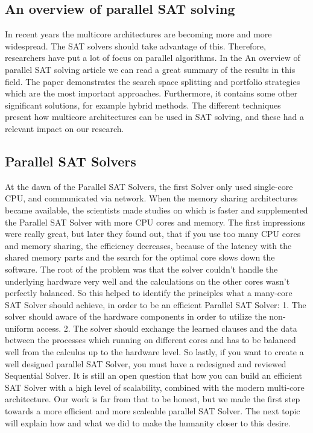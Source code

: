 \documentclass[12pt] {article}
\begin{document}
\subsection{An overview of parallel SAT solving}

In recent years the multicore architectures are becoming more and more wide\-spread. The SAT solvers should take advantage of this. Therefore, researchers have put a lot of focus on parallel algorithms. In the An overview of parallel SAT solving article we can read a great summary of the results in this field. The paper demonstrates the search space splitting and portfolio strategies which are the most important approaches. Furthermore, it contains some other significant solutions, for example hybrid methods. The different techniques present how multicore architectures can be used in SAT solving, and these had a relevant impact on our research.


\subsection{Parallel SAT Solvers}

At the dawn of the Parallel SAT Solvers, the first Solver only used single-core CPU, and communicated via network. When the memory sharing architectures became available, the scientists made studies on which is faster and supplemented the Parallel SAT Solver with more CPU cores and memory. The first impressions were really great, but later they found out, that if you use too many CPU cores and memory sharing, the efficiency decreases, because of the latency with the shared memory parts and the search for the optimal core slows down the software. The root of the problem was that the solver couldn't handle the underlying hardware very well and the calculations on the other cores wasn't perfectly balanced. So this helped to identify the principles what a many-core SAT Solver should achieve, in order to be an efficient Parallel SAT Solver:
1. The solver should aware of the hardware components in order to utilize the non-uniform access.
2. The solver should exchange the learned clauses and the data between the processes which running on different cores and has to be balanced well from the calculus up to the hardware level.
So lastly, if you want to create a well designed parallel SAT Solver, you must have a redesigned and reviewed Sequential Solver. It is still an open question that how you can build an efficient SAT Solver with a high level of scalability, combined with the modern multi-core architecture.
Our work is far from that to be honest, but we made the first step towards a more efficient and more scaleable parallel SAT Solver. The next topic will explain how and what we did to make the humanity closer to this desire.
\end{document}

